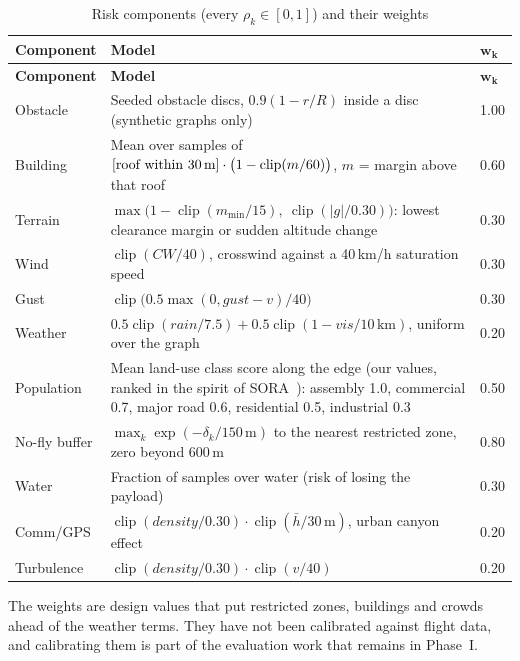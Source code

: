 \begin{small}
\begin{longtable}{|P{2.4cm}|P{10.6cm}|P{1.0cm}|}
\caption{Risk components (every $\rho_k \in [0,1]$) and their weights}\label{tab:risk}\\
\hline
\textbf{Component} & \textbf{Model} & $\boldsymbol{w_k}$\\
\hline
\endfirsthead
\hline
\textbf{Component} & \textbf{Model} & $\boldsymbol{w_k}$\\
\hline
\endhead
Obstacle & Seeded obstacle discs, $0.9(1 - r/R)$ inside a disc (synthetic graphs only) & 1.00\\
\hline
Building & Mean over samples of $[\text{roof within 30\,m}]\cdot\bigl(1-\operatorname{clip}(m/60)\bigr)$, $m$ = margin above that roof & 0.60\\
\hline
Terrain & $\max\bigl(1-\operatorname{clip}(m_{\min}/15),\ \operatorname{clip}(\lvert g\rvert/0.30)\bigr)$: lowest clearance margin or sudden altitude change & 0.30\\
\hline
Wind & $\operatorname{clip}(C\!W/40)$, crosswind against a 40\,km/h saturation speed & 0.30\\
\hline
Gust & $\operatorname{clip}\bigl(0.5\max(0, \mathit{gust} - v)/40\bigr)$ & 0.30\\
\hline
Weather & $0.5\operatorname{clip}(\mathit{rain}/7.5) + 0.5\operatorname{clip}(1 - \mathit{vis}/10\,\mathrm{km})$, uniform over the graph & 0.20\\
\hline
Population & Mean land-use class score along the edge (our values, ranked in the spirit of SORA~\cite{r22}): assembly 1.0, commercial 0.7, major road 0.6, residential 0.5, industrial 0.3 & 0.50\\
\hline
No-fly buffer & $\max_k \exp(-\delta_k/150\,\mathrm{m})$ to the nearest restricted zone, zero beyond 600\,m & 0.80\\
\hline
Water & Fraction of samples over water (risk of losing the payload) & 0.30\\
\hline
Comm/GPS & $\operatorname{clip}(\mathit{density}/0.30)\cdot\operatorname{clip}(\bar{h}/30\,\mathrm{m})$, urban canyon effect & 0.20\\
\hline
Turbulence & $\operatorname{clip}(\mathit{density}/0.30)\cdot\operatorname{clip}(v/40)$ & 0.20\\
\hline
\end{longtable}
\end{small}

The weights are design values that put restricted zones, buildings and crowds ahead of
the weather terms. They have not been calibrated against flight data, and calibrating
them is part of the evaluation work that remains in Phase~I.


